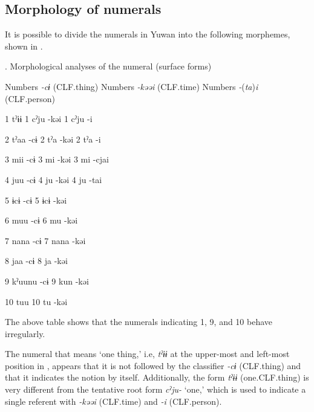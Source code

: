 \subsection{Morphology of numerals}

It is possible to divide the numerals in Yuwan into the following morphemes, shown in .

\begin{styleBeschriftung}
\textmd{}\textmd{. Morphological analyses of the numeral (surface forms)}
\end{styleBeschriftung}

Numbers  \textit{{}-cɨ} (CLF.thing)    Numbers  \textit{{}-kəəi} (CLF.time)    Numbers  \textit{{}-}(\textit{ta})\textit{i} (CLF.person)

1  tˀɨɨ      1  cˀju  {}-kəi    1  cˀju  {}-i

2  tˀaa  {}-cɨ    2  tˀa  {}-kəi    2  tˀa  {}-i

3  mii  {}-cɨ    3  mi  {}-kəi    3  mi  {}-cjai

4  juu  {}-cɨ    4  ju  {}-kəi    4  ju  {}-tai

5  ɨcɨ  {}-cɨ    5  ɨcɨ  {}-kəi        

6  muu  {}-cɨ    6  mu  {}-kəi        

7  nana  {}-cɨ    7  nana  {}-kəi        

8  jaa  {}-cɨ    8  ja  {}-kəi        

9  kˀuunu  {}-cɨ    9  kun  {}-kəi        

10  tuu      10  tu  {}-kəi        

\begin{styleBeschriftung}
\textmd{The above table shows that the numerals indicating 1, 9, and 10 behave irregularly.}
\end{styleBeschriftung}

\begin{styleBeschriftung}
\textmd{The numeral that means ‘one thing,’ i.e,} \textmd{\textit{tˀɨɨ}}\textmd{ at the upper-most and left-most position in , appears that it is not followed by the classifier} \textmd{\textit{{}-cɨ}}\textmd{ (CLF.thing) and} \textmd{that it indicates the notion by itself. Additionally, the form} \textmd{\textit{tˀɨɨ}}\textmd{ (one.CLF.thing) is very different from the tentative root form} \textmd{\textit{cˀju-}}\textmd{ ‘one,’ which is used to indicate a single referent with}\textmd{ \textit{-kəəi}}\textmd{ (CLF.time) and} \textmd{\textit{{}-i}}\textmd{ (CLF.person).}
\end{styleBeschriftung}


